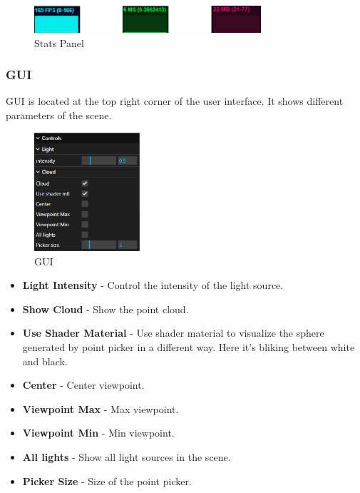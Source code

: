 \documentclass[11pt, a4paper,oneside,chapterprefix=false]{scrbook}
\begin{document}
\begin{minipage}{\textwidth}
	\begin{figure}[H]
        \centering
        \includegraphics*[width=0.75\textwidth]{figures/stats panel.png}
        \caption{Stats Panel}
        \label{fig:stats panel}
    \end{figure}
\end{minipage}

\subsubsection{GUI}

GUI is located at the top right corner of the user interface. It shows different parameters of the scene.

\begin{minipage}{\textwidth}
	\begin{figure}[H]
		\centering
		\includegraphics*[width=0.35\textwidth]{figures/GUI.png}
		\caption{GUI}
		\label{fig:gui}
	\end{figure}
\end{minipage}

\begin{itemize}
	\item \textbf{Light Intensity} - Control the intensity of the light source.
	\item \textbf{Show Cloud} - Show the point cloud.
	\item \textbf{Use Shader Material} - Use shader material to visualize the sphere generated by point picker in a different way. Here it's bliking between white and black.
	\item \textbf{Center} - Center viewpoint.
	\item \textbf{Viewpoint Max} - Max viewpoint.
	\item \textbf{Viewpoint Min} - Min viewpoint.
	\item \textbf{All lights} - Show all light sources in the scene.
	\item \textbf{Picker Size} - Size of the point picker.
\end{itemize}
\end{document}
